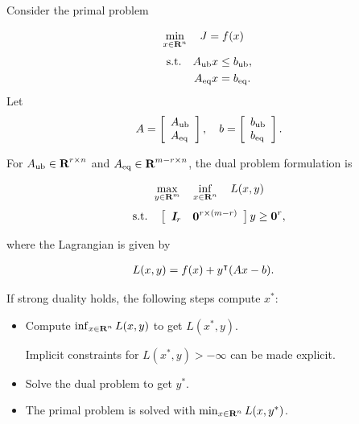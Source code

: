 \documentclass{article}
\begin{document}
Consider the primal problem

\begin{align*}
    \min_{x\in\textbf{R}^n}\quad
    J
    &=
            f(x)
\end{align*}
\begin{align*}
    \text{s.t.}\quad A_{\text{ub}} x&\leq b_{\text{ub}},\\
    A_{\text{eq}} x &= b_{\text{eq}}.\\
\end{align*}
Let
\begin{align*}
    A = \left[\begin{array}{lllllllllllllllllll}A_{\text{ub}} \\ A_{\text{eq}}\end{array}\right],\quad
    b = \left[\begin{array}{lllllllllllllllllll}b_{\text{ub}}\\b_{\text{eq}}\end{array}\right].
\end{align*}


For $A_{\text{ub}}\in\textbf{R}^{{r}\times n}$ and $A_{\text{eq}}\in\textbf{R}^{m-r\times n}$, the dual problem formulation is

\begin{align}
    \max_{y\in\textbf{R}^m}\quad 
    \inf_{x\in\textbf{R}^n}\quad L(x,y)
\end{align}
\begin{align*}
    \text{s.t.}\quad  \left[\begin{array}{lllllllllllllllllll}\emph{\textbf{I}}_{r}&\textbf{0}^{{r}\times (m-{r})}\end{array}\right]y\geq \textbf{0}^{r},
\end{align*}

where the Lagrangian is given by

\begin{align*}
    L(x,y) &= f(x)+ y^\intercal (A x - b).
\end{align*}

If strong duality holds, the following steps compute $x^*$:
\begin{itemize}
    
    \item Compute $\inf_{x\in\textbf{R}^n}L(x,y)$ to get $L(x^*,y)$.
    

    Implicit constraints for $L(x^*,y)>-\infty$ can be made explicit.
    
    \item Solve the dual problem to get $y^*$.
    
    \item  The primal problem is solved with $\min_{x\in\textbf{R}^n}L(x,y^*)$.
    
\end{itemize}

\end{document}
